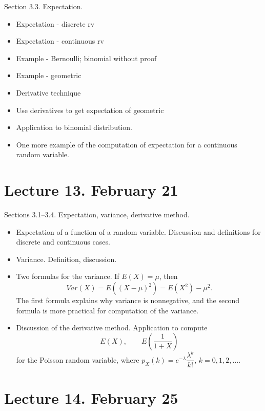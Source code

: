\documentclass[letterpaper,11pt,oneside,reqno]{amsart}
\numberwithin{equation}{section}
\theoremstyle{definition}
\begin{document}
Section 3.3. Expectation.

\begin{itemize}
	\item 
Expectation - discrete rv

\item 
Expectation - continuous rv
\item 
Example - Bernoulli; binomial without proof
\item 
Example - geometric
\item 
Derivative technique
\item 
Use derivatives to get expectation of geometric
\item 
	Application to binomial distribution.
\item One more example of the computation of expectation for a continuous random variable.
\end{itemize}

\section*{Lecture 13. February 21}

Sections 3.1--3.4. Expectation, variance, derivative method.
\begin{itemize}
	\item Expectation of a function of a random variable. Discussion and definitions for 
		discrete and continuous cases.
	\item Variance. Definition, discussion. 
	\item Two formulas for the variance. If $E(X)=\mu$, then
		\begin{equation*}
			Var(X)=E\left( (X-\mu)^2 \right)=E\left( X^2 \right)-\mu^2.
		\end{equation*}
		The first formula explains why variance is nonnegative, and the 
		second formula is more practical for computation of the variance. 
	\item Discussion of the derivative method. Application to compute
		\begin{equation*}
			E(X),\qquad E\left( \frac{1}{1+X} \right)
		\end{equation*}
		for the Poisson random variable, where $p_X(k)=e^{-\lambda}\dfrac{\lambda^k}{k!}$, $k=0,1,2,\ldots $.
\end{itemize}


\section*{Lecture 14. February 25}
\end{document}

